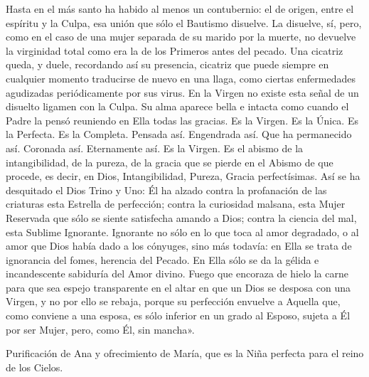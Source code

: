 \documentclass[12pt]{book} %
\begin{document}
Hasta en el más santo ha habido al menos un contubernio: el de origen, entre el espíritu y la Culpa, esa unión que sólo 
el Bautismo disuelve. La disuelve, sí, pero, como en el caso de una mujer separada de su marido por la muerte, no devuelve la virginidad total como era la de los Primeros antes del pecado. Una cicatriz queda, y duele, recordando así su presencia, cicatriz que puede siempre en cualquier momento traducirse de nuevo en una llaga, como ciertas enfermedades agudizadas periódicamente por sus virus. En la Virgen no existe esta señal de un disuelto ligamen con la Culpa. Su alma aparece bella e intacta como cuando el Padre la pensó reuniendo en Ella todas las gracias. 
Es la Virgen. Es la Única. Es la Perfecta. Es la Completa. Pensada así. Engendrada así. Que ha permanecido así. Coronada 
así. Eternamente así. Es la Virgen. Es el abismo de la intangibilidad, de la pureza, de la gracia que se pierde en el Abismo de que procede, es decir, en Dios, Intangibilidad, Pureza, Gracia perfectísimas. 
Así se ha desquitado el Dios Trino y Uno: Él ha alzado contra la profanación de las criaturas esta Estrella de perfección; 
contra la curiosidad malsana, esta Mujer Reservada que sólo se siente satisfecha amando a Dios; contra la ciencia del mal, esta Sublime Ignorante. Ignorante no sólo en lo que toca al amor degradado, o al amor que Dios había dado a los cónyuges, sino más todavía: en Ella se trata de ignorancia del fomes, herencia del Pecado. En Ella sólo se da la gélida e incandescente sabiduría del Amor divino. Fuego que encoraza de hielo la carne para que sea espejo transparente en el altar en que un Dios se desposa con una Virgen, y no por ello se rebaja, porque su perfección envuelve a Aquella que, como conviene a una esposa, es sólo inferior en un grado al Esposo, sujeta a Él por ser Mujer, pero, como Él, sin mancha».  

Purificación de Ana y ofrecimiento de María, que es la Niña perfecta para el reino de los Cielos. 
 
\end{document}
